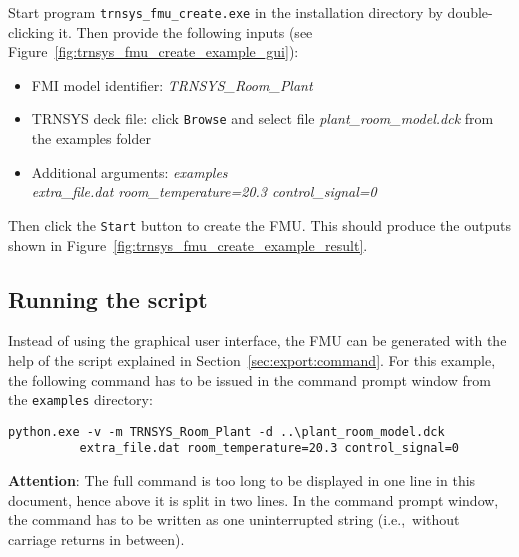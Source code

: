 Start program \texttt{trnsys\_fmu\_create.exe} in the installation directory by double-clicking it.
Then provide the following inputs (see Figure~\ref{fig:trnsys_fmu_create_example_gui}):
\begin{itemize}

  \item FMI model identifier: \textit{TRNSYS\_Room\_Plant}

  \item TRNSYS deck file: click \texttt{Browse} and select file \textit{plant\_room\_model.dck} from the examples folder

  \item Additional arguments: \textit{examples\\extra\_file.dat room\_temperature=20.3 control\_signal=0}

\end{itemize}
Then click the \texttt{Start} button to create the FMU.
This should produce the outputs shown in Figure~\ref{fig:trnsys_fmu_create_example_result}.



\subsection{Running the \python script}

Instead of using the graphical user interface, the FMU can be generated with the help of the \python script explained in Section~\ref{sec:export:command}.
For this example, the following command has to be issued in the command prompt window from the \texttt{examples} directory:
\begin{verbatim}
python.exe -v -m TRNSYS_Room_Plant -d ..\plant_room_model.dck 
          extra_file.dat room_temperature=20.3 control_signal=0
\end{verbatim}
\textbf{Attention}:
The full command is too long to be displayed in one line in this document, hence above it is split in two lines.
In the command prompt window, the command has to be written as one uninterrupted string (i.e.,~without carriage returns \keys{\return} in between).

